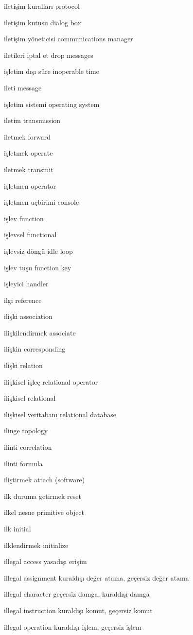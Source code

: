\documentclass[12pt,fleqn]{article}\usepackage{../../common}
\begin{document}
iletişim kuralları protocol

iletişim kutusu dialog box

iletişim yöneticisi communications manager

iletileri iptal et drop messages

işletim dışı süre inoperable time

ileti message

işletim sistemi operating system

iletim transmission

iletmek forward

işletmek operate

iletmek transmit

işletmen operator

işletmen uçbirimi console

işlev function

işlevsel functional

işlevsiz döngü idle loop

işlev tuşu function key

işleyici handler

ilgi reference

ilişki association

ilişkilendirmek associate

ilişkin corresponding

ilişki relation

ilişkisel işleç relational operator

ilişkisel relational

ilişkisel veritabanı relational database

ilinge topology

ilinti correlation

ilinti formula

iliştirmek attach (software)

ilk duruma getirmek reset

ilkel nesne primitive object

ilk initial

ilklendirmek initialize

illegal access yasadışı erişim

illegal assignment kuraldışı değer atama, geçersiz değer atama

illegal character geçersiz damga, kuraldışı damga

illegal instruction kuraldışı komut, geçersiz komut

illegal operation kuraldışı işlem, geçersiz işlem
\end{document}
